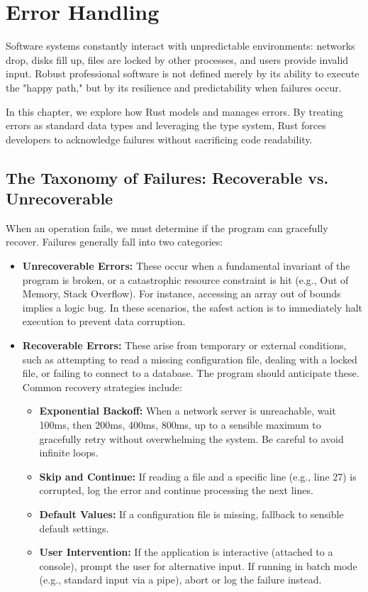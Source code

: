 \chapter{Error Handling}
\label{ch:error_handling}

Software systems constantly interact with unpredictable environments: networks drop, disks fill up, files are locked by other processes, and users provide invalid input. Robust professional software is not defined merely by its ability to execute the "happy path," but by its resilience and predictability when failures occur. 

In this chapter, we explore how Rust models and manages errors. By treating errors as standard data types and leveraging the type system, Rust forces developers to acknowledge failures without sacrificing code readability.

\section{The Taxonomy of Failures: Recoverable vs. Unrecoverable}

When an operation fails, we must determine if the program can gracefully recover. Failures generally fall into two categories:

\begin{itemize}
    \item \textbf{Unrecoverable Errors:} These occur when a fundamental invariant of the program is broken, or a catastrophic resource constraint is hit (e.g., Out of Memory, Stack Overflow). For instance, accessing an array out of bounds implies a logic bug. In these scenarios, the safest action is to immediately halt execution to prevent data corruption.
    \item \textbf{Recoverable Errors:} These arise from temporary or external conditions, such as attempting to read a missing configuration file, dealing with a locked file, or failing to connect to a database. The program should anticipate these. Common recovery strategies include:
    \begin{itemize}
        \item \textbf{Exponential Backoff:} When a network server is unreachable, wait 100ms, then 200ms, 400ms, 800ms, up to a sensible maximum to gracefully retry without overwhelming the system. Be careful to avoid infinite loops.
        \item \textbf{Skip and Continue:} If reading a file and a specific line (e.g., line 27) is corrupted, log the error and continue processing the next lines.
        \item \textbf{Default Values:} If a configuration file is missing, fallback to sensible default settings.
        \item \textbf{User Intervention:} If the application is interactive (attached to a console), prompt the user for alternative input. If running in batch mode (e.g., standard input via a pipe), abort or log the failure instead.
    \end{itemize}
\end{itemize}

